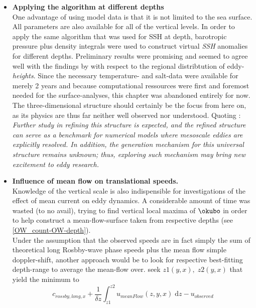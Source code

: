 \begin{itemize}
\setlength\itemsep{0mm}
\item
\textbf{Applying the algorithm at different depths}\\
One advantage of using model data is that it is not limited to the sea surface. All parameters are also available for all of the vertical levels. In order to apply the same algorithm that was used for SSH at depth, barotropic pressure plus density integrals were used to construct virtual \textit{SSH} anomalies for different depths. Preliminary results were promising and seemed to agree well with the findings by \citet{Petersen2013} with respect to the regional distribtution of eddy-\textit{heights}. Since the necessary temperature- and salt-data were available for merely 2 years and because computational ressources were first and foremost needed for the surface-analyses, this chapter was abandoned entirely for now.
The three-dimensional structure should certainly be the focus from here on, as its physics are thus far neither well observed nor understood. Quoting \citep{Zhang2013}: \textit{Further study in refining this structure is expected, and the refined structure can serve as a benchmark for numerical models where mesoscale eddies are explicitly resolved. In addition, the generation mechanism for this universal structure remains unknown; thus, exploring such mechanism may bring new excitement to eddy research.} \\

\item
\textbf{Influence of mean flow on translational speeds.}\\
Knowledge of the vertical scale is also indispensible for investigations of the effect of mean current on eddy dynamics. A considerable amount of time was wasted (to no avail), trying to find vertical local maxima of $\okubo$ in order to help construct a mean-flow-surface taken from respective depths (see \cref{OW_count-OW-depth}).\\
Under the assumption that the observed speeds are in fact simply the sum of theoretical long Rosbby-wave phase speeds plus the mean flow \ie simple doppler-shift, another approach would be to look for respective best-fitting depth-range to average the mean-flow over. \Ie seek $z1(y,x),\; z2(y,x)$ that yield the minimum to
\begin{equation}
c_{rossby,long,x}
+
\frac{1}{\delta z} \int_{z1}^{z2} u_{meanFlow}(z,y,x) \; \mathrm{d}z
-
u_{observed}
\end{equation}


\end{itemize}
